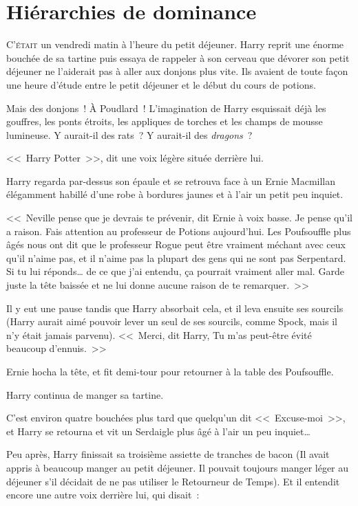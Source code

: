 \chapter{Hiérarchies de dominance}

\lettrine{C}{'était} un vendredi matin à l'heure du petit déjeuner. Harry reprit une énorme bouchée de sa tartine puis essaya de rappeler à son cerveau que dévorer son petit déjeuner ne l'aiderait pas à aller aux donjons plus vite. Ils avaient de toute façon une heure d'étude entre le petit déjeuner et le début du cours de potions.

Mais des donjons~! À Poudlard~! L'imagination de Harry esquissait déjà les gouffres, les ponts étroits, les appliques de torches et les champs de mousse lumineuse. Y aurait-il des rats~? Y aurait-il des \emph{dragons}~?

<<~Harry Potter~>>, dit une voix légère située derrière lui.

Harry regarda par-dessus son épaule et se retrouva face à un Ernie Macmillan élégamment habillé d’une robe à bordures jaunes et à l'air un petit peu inquiet.

<<~Neville pense que je devrais te prévenir, dit Ernie à voix basse. Je pense qu'il a raison. Fais attention au professeur de Potions aujourd'hui. Les Poufsouffle plus âgés nous ont dit que le professeur Rogue peut être vraiment méchant avec ceux qu'il n'aime pas, et il n'aime pas la plupart des gens qui ne sont pas Serpentard. Si tu lui réponds… de ce que j'ai entendu, ça pourrait vraiment aller mal. Garde juste la tête baissée et ne lui donne aucune raison de te remarquer.~>>

Il y eut une pause tandis que Harry absorbait cela, et il leva ensuite ses sourcils (Harry aurait aimé pouvoir lever un seul de ses sourcils, comme Spock, mais il n'y était jamais parvenu). <<~Merci, dit Harry, Tu m'as peut-être évité beaucoup d'ennuis.~>>

Ernie hocha la tête, et fit demi-tour pour retourner à la table des Poufsouffle.

Harry continua de manger sa tartine.

C'est environ quatre bouchées plus tard que quelqu'un dit <<~Excuse-moi~>>, et Harry se retourna et vit un Serdaigle plus âgé à l'air un peu inquiet…

Peu après, Harry finissait sa troisième assiette de tranches de bacon (Il avait appris à beaucoup manger au petit déjeuner. Il pouvait toujours manger léger au déjeuner s'il décidait de ne pas utiliser le Retourneur de Temps). Et il entendit encore une autre voix derrière lui, qui disait~:

